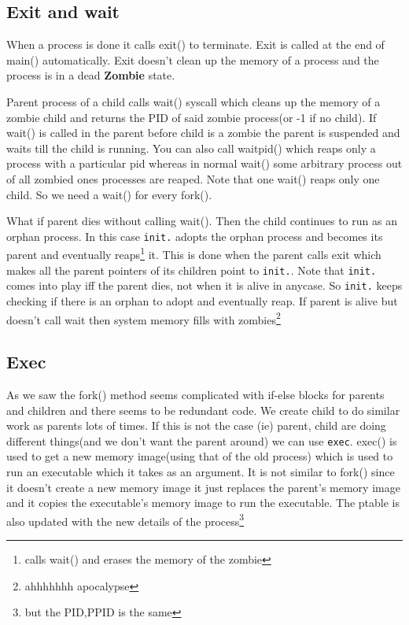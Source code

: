\documentclass[12pt]{article}
\newcommand{\tbox}[1]{\noindent\fbox{\parbox{\textwidth}{#1}}}
\begin{document}
\newpage
\noindent\tbox{
    \begin{center}
    \textbf{\Huge Lecture 4}
    \end{center}
}
\subsection{Exit and wait}
When a process is done it calls exit() to terminate. Exit is called at the end of main() automatically.
Exit doesn't clean up the memory of a process and the process is in a dead \textbf{Zombie} state.

Parent process of a child calls wait() syscall which cleans up the memory of a zombie child and returns the PID of said zombie process(or -1 if no child). If wait() is called in the
parent before child is a zombie the parent is suspended and waits till the child is 
running. You can also call waitpid() which reaps only a process with a particular pid whereas in normal 
wait() some arbitrary process out of all zombied ones processes are reaped. Note that one wait() reaps only one child. So we need a wait() for every fork().


What if parent dies without calling wait(). Then the child continues to run as an orphan process. In this case \texttt{init.} 
adopts the orphan process and becomes its parent and eventually reaps\footnote{calls wait() and erases the memory of the zombie} it. This is done when the parent calls exit which makes all the parent
pointers of its children point to \texttt{init.}. Note that \texttt{init.} comes into play iff the parent dies, not when it is alive in anycase. So \texttt{init.} keeps
checking if there is an orphan to adopt and eventually reap. If parent is alive but doesn't call wait then system memory fills with zombies\footnote{ahhhhhhh apocalypse}


\subsection{Exec}
As we saw the fork() method seems complicated with if-else blocks for parents and children and there seems to be redundant code. We create
child to do similar work as parents lots of times. If this is not the case (ie) parent, child are doing different things(and we don't want the parent around) we can use \texttt{exec}.
exec() is used to get a new memory image(using that of the old process) which is used to run an executable which it takes as an argument. It is not similar to fork() since it doesn't create a new memory image
it just replaces the parent's memory image and it copies the executable's memory image to run the executable. The ptable is also updated with the new details of the process\footnote{but the PID,PPID is the same}
\end{document}
